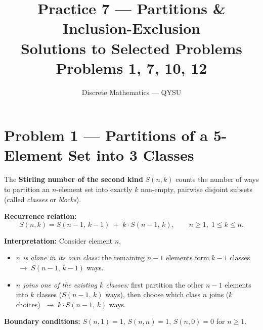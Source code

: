 \documentclass[12pt, a4paper]{article}
\title{\textbf{Practice 7 --- Partitions \& Inclusion-Exclusion}\\[4pt]
       \large Solutions to Selected Problems\\[2pt]
       \normalsize Problems 1, 7, 10, 12}
\author{Discrete Mathematics --- QYSU}
\date{}
\begin{document}
\maketitle
\tableofcontents
\newpage

\section{Problem 1 --- Partitions of a 5-Element Set into 3 Classes}

\begin{theorybox}
The \textbf{Stirling number of the second kind} $S(n,k)$ counts the number
of ways to partition an $n$-element set into exactly $k$ non-empty,
pairwise disjoint subsets (called \emph{classes} or \emph{blocks}).

\medskip
\textbf{Recurrence relation:}
\[
  S(n,k) = S(n-1,\, k-1) \;+\; k \cdot S(n-1,\, k),
  \qquad n \ge 1,\; 1 \le k \le n.
\]

\textbf{Interpretation:}\; Consider element $n$.
\begin{itemize}[nosep]
  \item \emph{$n$ is alone in its own class:}\;
        the remaining $n-1$ elements form $k-1$ classes
        $\;\longrightarrow\; S(n-1,\,k-1)$ ways.
  \item \emph{$n$ joins one of the existing $k$ classes:}\;
        first partition the other $n-1$ elements into $k$ classes
        ($S(n-1,\,k)$ ways), then choose which class $n$ joins ($k$ choices)
        $\;\longrightarrow\; k \cdot S(n-1,\,k)$ ways.
\end{itemize}

\medskip
\textbf{Boundary conditions:}\;
$S(n,1) = 1$,\; $S(n,n) = 1$,\; $S(n,0) = 0$ for $n \ge 1$.

\begin{center}
\end{center}
\end{theorybox}
\end{document}
